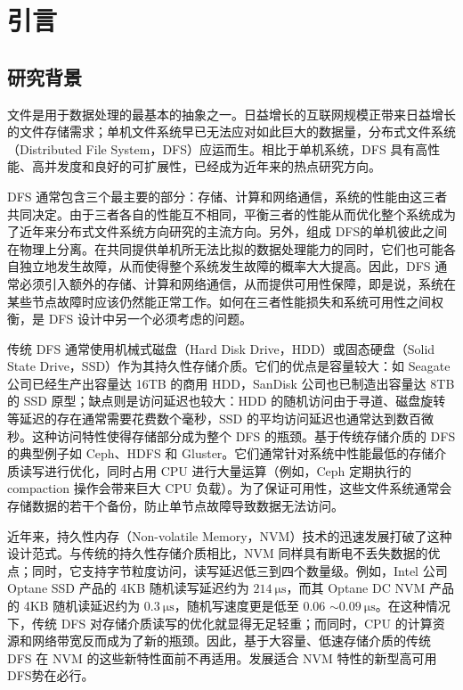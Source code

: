 
\chapter{引言}
\label{cha:intro}


\section{研究背景}
\label{sec:ch1_background}

文件是用于数据处理的最基本的抽象之一。日益增长的互联网规模正带来日益增长的文件存储需求；单机文件系统早已无法应对如此巨大的数据量，分布式文件系统（Distributed File System，DFS）应运而生。相比于单机系统，DFS 具有高性能、高并发度和良好的可扩展性，已经成为近年来的热点研究方向。

DFS 通常包含三个最主要的部分：存储、计算和网络通信，系统的性能由这三者共同决定。由于三者各自的性能互不相同，平衡三者的性能从而优化整个系统成为了近年来分布式文件系统方向研究的主流方向。另外，组成 DFS的单机彼此之间在物理上分离。在共同提供单机所无法比拟的数据处理能力的同时，它们也可能各自独立地发生故障，从而使得整个系统发生故障的概率大大提高。因此，DFS 通常必须引入额外的存储、计算和网络通信，从而提供可用性保障，即是说，系统在某些节点故障时应该仍然能正常工作。如何在三者性能损失和系统可用性之间权衡，是 DFS 设计中另一个必须考虑的问题。

传统 DFS 通常使用机械式磁盘（Hard Disk Drive，HDD）或固态硬盘（Solid State Drive，SSD）作为其持久性存储介质。它们的优点是容量较大：如 Seagate 公司已经生产出容量达 16TB 的商用 HDD，SanDisk 公司也已制造出容量达 8TB 的 SSD 原型；缺点则是访问延迟也较大：HDD 的随机访问由于寻道、磁盘旋转等延迟的存在通常需要花费数个毫秒，SSD 的平均访问延迟也通常达到数百微秒。这种访问特性使得存储部分成为整个 DFS 的瓶颈。基于传统存储介质的 DFS 的典型例子如 Ceph\cite{ceph2006}、HDFS\cite{hadoop2010} 和 Gluster\cite{gluster2013}。它们通常针对系统中性能最低的存储介质读写进行优化，同时占用 CPU 进行大量运算（例如，Ceph 定期执行的 compaction 操作会带来巨大 CPU 负载）。为了保证可用性，这些文件系统通常会存储数据的若干个备份，防止单节点故障导致数据无法访问。

近年来，持久性内存（Non-volatile Memory，NVM）技术的迅速发展打破了这种设计范式。与传统的持久性存储介质相比，NVM 同样具有断电不丢失数据的优点；同时，它支持字节粒度访问，读写延迟低三到四个数量级。例如，Intel 公司 Optane\textsuperscript{\texttrademark} SSD 产品的 4KB 随机读写延迟约为 $\SI{214}{\us}$\cite{optanessd}，而其 Optane\textsuperscript{\texttrademark} DC NVM 产品的 4KB 随机读延迟约为 $\SI{0.3}{\us}$，随机写速度更是低至 0.06 $\sim \SI{0.09}{\us}$\cite{yangnvm2020}。在这种情况下，传统 DFS 对存储介质读写的优化就显得无足轻重；而同时，CPU 的计算资源和网络带宽反而成为了新的瓶颈。因此，基于大容量、低速存储介质的传统 DFS 在 NVM 的这些新特性面前不再适用。发展适合 NVM 特性的新型高可用 DFS势在必行。

